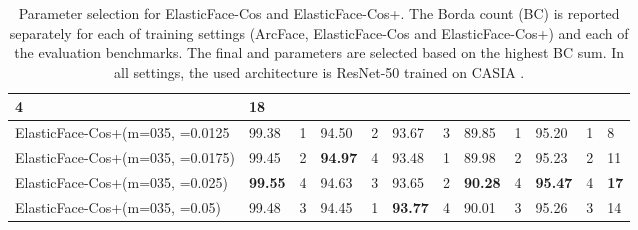 \documentclass[letterpaper, 10 pt, conference]{ieeeconf}  \usepackage{times}
\begin{document}
\begin{table}[ht!]
{\begin{tabular}{|l|ll|ll|ll|ll|ll|l|}
  4 &
  \textbf{18} \\ \hline \hline
ElasticFace-Cos+(m=035, =0.0125 &
  \multicolumn{1}{l|}{99.38} &
  1 &
  \multicolumn{1}{l|}{94.50} &
  2 &
  \multicolumn{1}{l|}{93.67} &
  3 &
  \multicolumn{1}{l|}{89.85} &
  1 &
  \multicolumn{1}{l|}{95.20} &
  1 &
  8 \\ \hline
ElasticFace-Cos+(m=035, =0.0175) &
  \multicolumn{1}{l|}{99.45} &
  2 &
  \multicolumn{1}{l|}{\textbf{94.97}} &
  4 &
  \multicolumn{1}{l|}{93.48} &
  1 &
  \multicolumn{1}{l|}{89.98} &
  2 &
  \multicolumn{1}{l|}{95.23} &
  2 &
  11 \\ \hline
ElasticFace-Cos+(m=035, =0.025) &
  \multicolumn{1}{l|}{\textbf{99.55}} &
  4 &
  \multicolumn{1}{l|}{94.63} &
  3 &
  \multicolumn{1}{l|}{93.65} &
  2 &
  \multicolumn{1}{l|}{\textbf{90.28}} &
  4 &
  \multicolumn{1}{l|}{\textbf{95.47}} &
  4 &
  \textbf{17} \\ \hline
ElasticFace-Cos+(m=035, =0.05) &
  \multicolumn{1}{l|}{99.48} &
  3 &
  \multicolumn{1}{l|}{94.45} &
  1 &
  \multicolumn{1}{l|}{\textbf{93.77}} &
  4 &
  \multicolumn{1}{l|}{90.01} &
  3 &
  \multicolumn{1}{l|}{95.26} &
  3 &
  14 \\ \hline
\end{tabular}}
\caption{Parameter selection for ElasticFace-Cos and ElasticFace-Cos+. 
The Borda count (BC) is reported separately for each of training settings (ArcFace, ElasticFace-Cos and ElasticFace-Cos+) and each of the evaluation benchmarks.  The final  and  parameters are selected based on the highest BC sum.
In all settings, the used architecture is ResNet-50 trained on CASIA \cite{DBLP:journals/corr/YiLLL14a}.}
\label{tab:cos_parameter}
\end{table}
\end{document}
